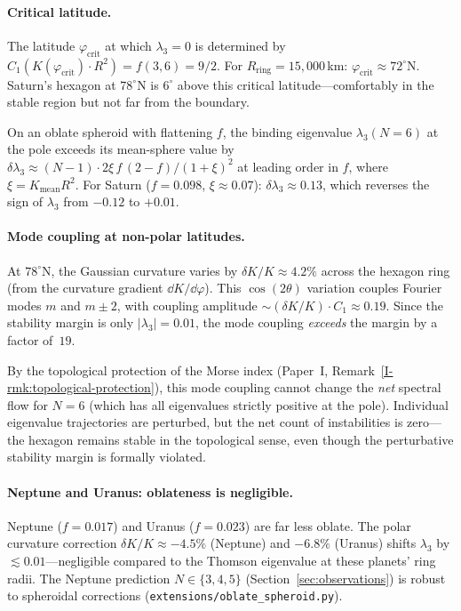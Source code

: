 \paragraph{Critical latitude.}
The latitude $\varphi_{\mathrm{crit}}$ at which $\lambda_3 = 0$
is determined by $C_1(K(\varphi_{\mathrm{crit}})\cdot R^2) =
f(3,6) = 9/2$.  For $R_{\mathrm{ring}} = 15{,}000$\,km:
$\varphi_{\mathrm{crit}} \approx 72^\circ\mathrm{N}$.
Saturn's hexagon at $78^\circ$N is $6^\circ$ above this
critical latitude---comfortably in the stable region but
not far from the boundary.

\begin{proposition}
\label{prop:oblateness}
On an oblate spheroid with flattening $f$, the binding
eigenvalue $\lambda_3(N{=}6)$ at the pole exceeds its mean-sphere
value by $\delta\lambda_3 \approx (N{-}1)\cdot 2\xi\, f\,(2{-}f)
/(1{+}\xi)^2$ at leading order in $f$, where $\xi = K_{\mathrm{mean}}
R^2$.  For Saturn ($f = 0.098$, $\xi \approx 0.07$):
$\delta\lambda_3 \approx 0.13$, which reverses the sign of
$\lambda_3$ from $-0.12$ to $+0.01$.
\end{proposition}

\paragraph{Mode coupling at non-polar latitudes.}
At $78^\circ$N, the Gaussian curvature varies by
$\delta K/K \approx 4.2\%$ across the hexagon ring (from the
curvature gradient $\dd K/\dd\varphi$).  This $\cos(2\theta)$
variation couples Fourier modes $m$ and $m \pm 2$, with coupling
amplitude $\sim (\delta K/K)\cdot C_1 \approx 0.19$.  Since the
stability margin is only $|\lambda_3| = 0.01$, the mode coupling
\emph{exceeds} the margin by a factor of~$19$.

By the topological protection of the Morse index
(Paper~I, Remark~\ref{I-rmk:topological-protection}), this
mode coupling cannot change the \emph{net} spectral flow for
$N = 6$ (which has all eigenvalues strictly positive at the pole).
Individual eigenvalue trajectories are perturbed, but the
net count of instabilities is zero---the hexagon remains stable
in the topological sense, even though the perturbative stability
margin is formally violated.

\paragraph{Neptune and Uranus: oblateness is negligible.}
Neptune ($f = 0.017$) and Uranus ($f = 0.023$) are far less
oblate.  The polar curvature correction $\delta K/K \approx
-4.5\%$ (Neptune) and $-6.8\%$ (Uranus) shifts $\lambda_3$
by $\lesssim 0.01$---negligible compared to the Thomson
eigenvalue at these planets' ring radii.  The Neptune prediction
$N \in \{3, 4, 5\}$ (Section~\ref{sec:observations}) is robust
to spheroidal corrections
(\texttt{extensions/oblate\_spheroid.py}).


